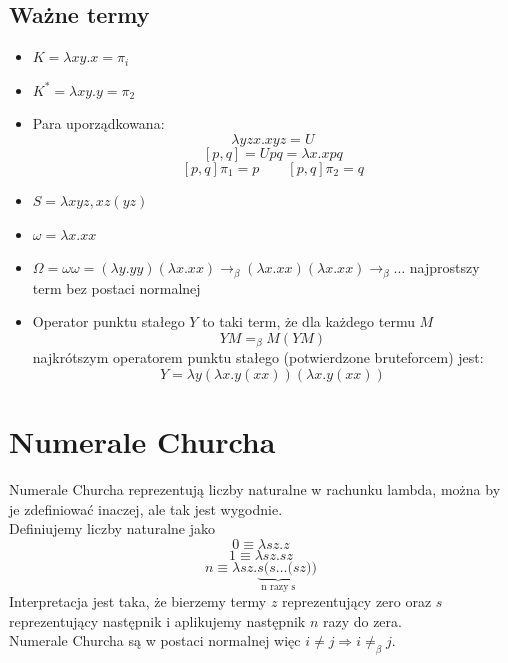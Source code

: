 \subsection*{Ważne termy}
\begin{itemize}
    \item \(K = \lambda xy.x = \pi_i\) 
    \item \(K^* = \lambda xy.y = \pi_2\)
    \item Para uporządkowana:
    \[ \lambda yzx.xyz=U \] 
    \[ [p,q] = Upq = \lambda x.x pq \]
    \[ [p,q]\pi_1 = p \qquad [p,q]\pi_2=q \]
    \item \(S = \lambda xyz,xz(yz)\)
    \item \(\omega = \lambda x.xx\)
    \item \(\Omega = \omega \omega = (\lambda y.yy)(\lambda x.xx) \to_{\beta} (\lambda x.xx)(\lambda x.xx) \to_{\beta} \dots \) najprostszy term bez postaci normalnej
    \item Operator punktu stałego \(Y\) to taki term, że dla każdego termu \(M\)
    \[ YM =_\beta M(YM) \]
    najkrótszym operatorem punktu stałego (potwierdzone bruteforcem) jest:
    \[ Y = \lambda y(\lambda x.y(xx))(\lambda x.y(xx)) \]
\end{itemize}

\section{Numerale Churcha}
Numerale Churcha reprezentują liczby naturalne w rachunku lambda, można by je zdefiniować inaczej, ale tak jest wygodnie.
\\

Definiujemy liczby naturalne jako
\[ 0\equiv\lambda sz.z \]
\[ 1 \equiv \lambda sz.sz \]
\[ n \equiv \lambda sz. \underbrace{s(s\dots(s}_{\text{n razy s}}z)) \]
Interpretacja jest taka, że bierzemy termy \(z\) reprezentujący zero oraz \(s\) reprezentujący następnik i aplikujemy następnik \(n\) razy do zera. \\
Numerale Churcha są w postaci normalnej więc \(i \neq j \Rightarrow i \neq_\beta j\).
